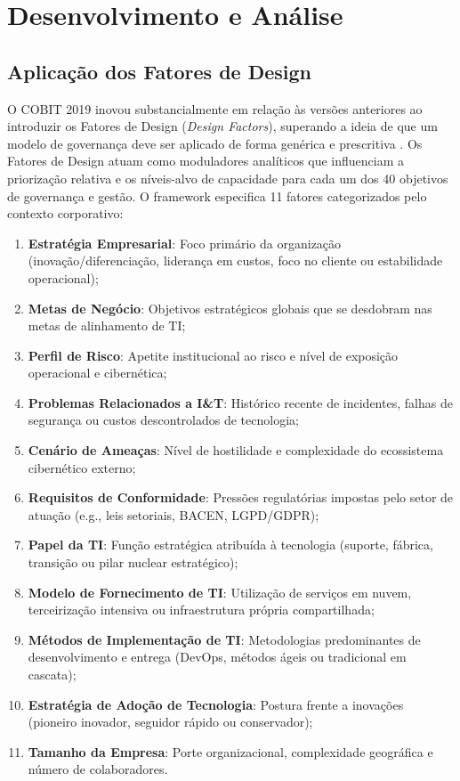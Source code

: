 \section{Desenvolvimento e Análise}

\subsection{Aplicação dos Fatores de Design}

O COBIT 2019 inovou substancialmente em relação às versões anteriores ao introduzir os Fatores de Design (\textit{Design Factors}), superando a ideia de que um modelo de governança deve ser aplicado de forma genérica e prescritiva \cite{isaca2019design}. Os Fatores de Design atuam como moduladores analíticos que influenciam a priorização relativa e os níveis-alvo de capacidade para cada um dos 40 objetivos de governança e gestão. O framework especifica 11 fatores categorizados pelo contexto corporativo:

\begin{enumerate}
    \item \textbf{Estratégia Empresarial}: Foco primário da organização (inovação/diferenciação, liderança em custos, foco no cliente ou estabilidade operacional);
    \item \textbf{Metas de Negócio}: Objetivos estratégicos globais que se desdobram nas metas de alinhamento de TI;
    \item \textbf{Perfil de Risco}: Apetite institucional ao risco e nível de exposição operacional e cibernética;
    \item \textbf{Problemas Relacionados a I\&T}: Histórico recente de incidentes, falhas de segurança ou custos descontrolados de tecnologia;
    \item \textbf{Cenário de Ameaças}: Nível de hostilidade e complexidade do ecossistema cibernético externo;
    \item \textbf{Requisitos de Conformidade}: Pressões regulatórias impostas pelo setor de atuação (e.g., leis setoriais, BACEN, LGPD/GDPR);
    \item \textbf{Papel da TI}: Função estratégica atribuída à tecnologia (suporte, fábrica, transição ou pilar nuclear estratégico);
    \item \textbf{Modelo de Fornecimento de TI}: Utilização de serviços em nuvem, terceirização intensiva ou infraestrutura própria compartilhada;
    \item \textbf{Métodos de Implementação de TI}: Metodologias predominantes de desenvolvimento e entrega (DevOps, métodos ágeis ou tradicional em cascata);
    \item \textbf{Estratégia de Adoção de Tecnologia}: Postura frente a inovações (pioneiro inovador, seguidor rápido ou conservador);
    \item \textbf{Tamanho da Empresa}: Porte organizacional, complexidade geográfica e número de colaboradores.
\end{enumerate}

